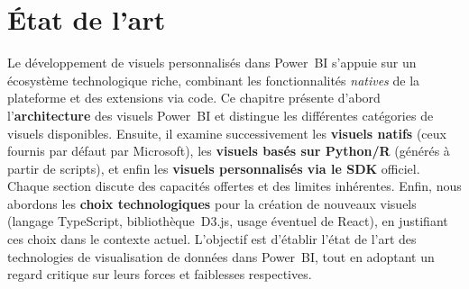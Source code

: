 \chapter{État de l'art}
\label{chap:state-of-the-art}
\setlength{\parindent}{0pt}


Le développement de visuels personnalisés dans Power~BI s’appuie sur un
écosystème technologique riche, combinant les fonctionnalités \emph{natives}
de la plateforme et des extensions via code.  
Ce chapitre présente d’abord l’\textbf{architecture} des visuels Power~BI et
distingue les différentes catégories de visuels disponibles.  
Ensuite, il examine successivement les \textbf{visuels natifs}
(ceux fournis par défaut par Microsoft), les \textbf{visuels basés sur
Python/R} (générés à partir de scripts), et enfin les \textbf{visuels
personnalisés via le SDK} officiel.  
Chaque section discute des capacités offertes et des limites inhérentes.  
Enfin, nous abordons les \textbf{choix technologiques} pour la création de
nouveaux visuels (langage TypeScript, bibliothèque~D3.js, usage éventuel de
React), en justifiant ces choix dans le contexte actuel.  
L’objectif est d’établir l’état de l’art des technologies de visualisation de
données dans Power~BI, tout en adoptant un regard critique sur leurs forces et
faiblesses respectives.











